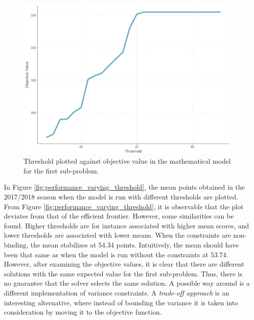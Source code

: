 \begin{figure}[H]
    \centering
    \includegraphics[scale=0.5]{fig/chapter_7/GW1_var.png}
    \caption{Threshold plotted against objective value in the mathematical model for the first sub-problem.}
\label{fig:threshold_GW1}    
\end{figure}%


In Figure \ref{fig:performance_varying_threshold}, the mean points obtained in the 2017/2018 season when the model is run with different thresholds are plotted. From Figure \ref{fig:performance_varying_threshold}, it is observable that the plot deviates from that of the efficient frontier. However, some similarities can be found. Higher thresholds are for instance associated with higher mean scores, and lower thresholds are associated with lower means. When the constraints are non-binding, the mean stabilizes at 54.34 points. Intuitively, the mean should have been that same as when the model is run without the constraints at 53.74. However, after examining the objective values, it is clear that there are different solutions with the same expected value for the first sub-problem. Thus, there is no guarantee that the solver selects the same solution. A possible way around is a different implementation of variance constraints. A \textit{trade-off approach} \citep{Speranza} is an interesting alternative, where instead of bounding the variance it is taken into consideration by moving it to the objective function.


\newpar


